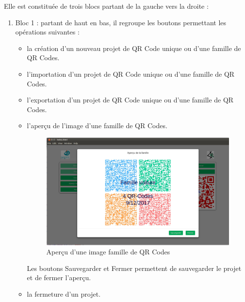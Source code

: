 \par
Elle est constituée de trois blocs partant de la gauche vers la droite : 
\begin{enumerate}
\item Bloc 1 : partant de haut en bas, il regroupe les boutons permettant les opérations suivantes :
	\begin{itemize}
	\item la création d'un nouveau projet de QR Code unique ou d'une famille de QR Codes.
	\item l'importation d'un projet de QR Code unique ou d'une famille de QR Codes.
	\item l'exportation d'un projet de QR Code unique ou d'une famille de QR Codes.
	\item l'aperçu de l'image d'une famille de QR Codes.

\begin{figure}[!h]
			\centering
		   	\includegraphics[scale=0.25]{img/image-famille.png}
		   	\caption{Aperçu d'une image famille de QR Codes}
		\end{figure}
	
	Les boutons Sauvegarder et Fermer permettent de sauvegarder le projet et de fermer l'aperçu.\\
	\item la fermeture d'un projet.
	\end{itemize}
	

\end{enumerate}
